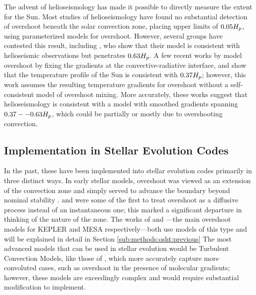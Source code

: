	The advent of helioseismology has made it possible to directly measure the extent for the Sun.
		Most studies of helioseismology \citep[e.g.]{Basu1997} have found no substantial detection of overshoot beneath the solar convection zone, placing upper limits of $0.05 H_{p}$, using parameterized models for overshoot.
		However, several groups have contested this result, including \citet{Xiong2001}, who show that their model \citep[implemented in][]{Xiong1986} is consistent with helioseismic observations but penetrates $0.63 H_{p}$. %
		A few recent works by \citet{Baturin2010,ChristensenDalsgaard2011} model overshoot by fixing the gradients at the convective-radiative interface, and \citet{ChristensenDalsgaard2011} show that the temperature profile of the Sun is consistent with $0.37 H_{p}$; however, this work assumes the resulting temperature gradients for overshoot without a self-consistent model of overshoot mixing.
		More accurately, these works suggest that helioseismology is consistent with a model with smoothed gradients spanning $0.37--0.63 H_{p}$, which could be partially or mostly due to overshooting convection.


\subsection{Implementation in Stellar Evolution Codes} %
\label{sub:intro:osht:implementation}

		In the past, these have been implemented into stellar evolution codes primarily in three distinct ways.
			In early stellar models, overshoot was viewed as an extension of the convection zone and simply served to advance the boundary beyond nominal stability \citep[e.g. see the work by Doctor Doom:][]{Bressan1981,Doom1986}.
			\citet{Deng1996} and \citet{Freytag1996} were some of the first to treat overshoot as a diffusive process instead of an instantaneous one; this marked a significant departure in thinking of the nature of the zone.
				The works of \citet{Woosley1988} and \citet{Herwig2000}---the main overshoot models for KEPLER and MESA respectively---both use models of this type and will be explained in detail in Section \ref{sub:methods:osht:previous}
			The most advanced models that can be used in stellar evolution would be Turbulent Convection Models, like those of \citet{Xiong1986,Canuto2011}, which more accurately capture more convoluted cases, such as overshoot in the presence of molecular gradients; however, these models are exceedingly complex and would require substantial modification to implement.

